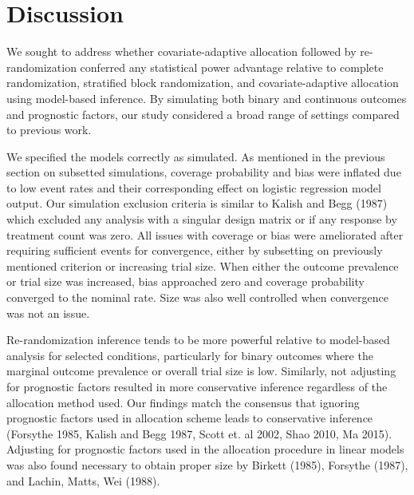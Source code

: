 \section{Discussion}
We sought to address whether covariate-adaptive allocation followed by re-randomization conferred any statistical power advantage relative to complete randomization, stratified block randomization, and covariate-adaptive allocation using model-based inference.
By simulating both binary and continuous outcomes and prognostic factors, our study considered a broad range of settings compared to previous work.

We specified the models correctly as simulated. 
As mentioned in the previous section on subsetted simulations, coverage probability and bias were inflated due to low event rates and their corresponding effect on logistic regression model output.
Our simulation exclusion criteria is similar to Kalish and Begg (1987) which excluded any analysis with a singular design matrix or if any response by treatment count was zero.
All issues with coverage or bias were ameliorated after requiring sufficient events for convergence, either by subsetting on previously mentioned criterion or increasing trial size.
When either the outcome prevalence or trial size was increased, bias approached zero and coverage probability converged to the nominal rate.
Size was also well controlled when convergence was not an issue.

Re-randomization inference tends to be more powerful relative to model-based analysis for selected conditions, particularly for binary outcomes where the marginal outcome prevalence or overall trial size is low.
Similarly, not adjusting for prognostic factors resulted in more conservative inference regardless of the allocation method used.  
Our findings match the consensus that ignoring prognostic factors used in allocation scheme leads to conservative inference (Forsythe 1985, Kalish and Begg 1987, Scott et. al 2002, Shao 2010, Ma 2015).
Adjusting for prognostic factors used in the allocation procedure in linear models was also found necessary to obtain proper size by Birkett (1985), Forsythe (1987), and Lachin, Matts, Wei (1988).

